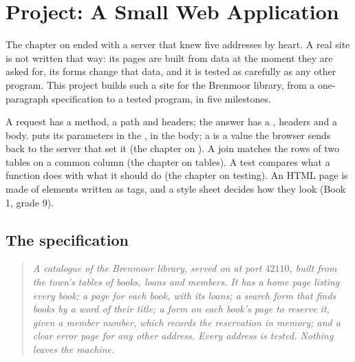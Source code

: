 \chapter{Project: A Small Web Application}\label{ch:g10:project-web-application}

The chapter on  ended with a server that knew five addresses by heart. A real site is not written that way:
its pages are built from data at the moment they are asked for, its forms change that data, and it is tested as
carefully as any other program. This project builds such a site for the Brenmoor library, from a one-paragraph
specification to a tested program, in five milestones.

\begin{recall}
A request has a method, a path and headers; the answer has a , headers and a body.  puts its
parameters in the ,  in the body; a  is a value the browser sends back to the server that
set it (the chapter on ). A join matches the rows of two tables on a common column (the chapter on tables). A
test compares what a function does with what it should do (the chapter on testing). An HTML page is made of
elements written as tags, and a style sheet decides how they look (Book 1, grade 9).
\end{recall}

\section{The specification}\label{sec:g10:project-web-application:spec}

\begin{quote}
\itshape A catalogue of the Brenmoor library, served on  at port $42110$, built from the town's
tables of books, loans and members. It has a home page listing every book; a page for each book, with its loans; a
search form that finds books by a word of their title; a form on each book's page to reserve it, given a member
number, which records the reservation in memory; and a clear error page for any other address. Every address is
tested. Nothing leaves the machine.
\end{quote}

